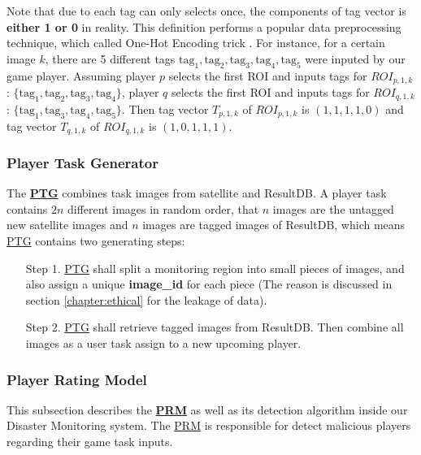 Note that due to each tag can only selects once, the components of tag vector is \textbf{either 1 or 0} in reality.
This definition performs a popular data preprocessing technique, which called One-Hot Encoding trick \cite{wu2012foundations, liu2002discretization}.
For instance, for a certain image $k$,
there are 5 different tags $\text{tag}_1, \text{tag}_2, \text{tag}_3, \text{tag}_4, \text{tag}_5$ were inputed
by our game player.
Assuming player $p$ selects the first ROI and inputs tags for $ROI_{p, 1, k}$: 
$\{\text{tag}_1, \text{tag}_2, \text{tag}_3, \text{tag}_4\}$, 
player $q$ selects the first ROI and inputs tags for $ROI_{q, 1, k}$:
$\{\text{tag}_1, \text{tag}_3, \text{tag}_4, \text{tag}_5\}$. 
Then tag vector $T_{p, 1, k}$ of $ROI_{p, 1, k}$ is $(1, 1, 1, 1, 0)$ and tag vector
$T_{q, 1, k}$ of $ROI_{q, 1, k}$ is $(1, 0, 1, 1, 1)$.

\subsubsection{Player Task Generator}

The \textbf{\hyperref[idx:ptg]{PTG}} combines task images from satellite and ResultDB.
A player task contains $2n$ different images in random order, that $n$ images are
the untagged new satellite images and $n$ images are tagged images of ResultDB, which means
\hyperref[idx:ptg]{PTG} contains two generating steps:

\begin{itemize}
\item [Step 1.] \hyperref[idx:ptg]{PTG} shall split a monitoring region into small pieces of images, 
and also assign a unique \textbf{image\_id} for each piece 
(The reason is discussed in section \ref{chapter:ethical} for the leakage of data).

\item [Step 2.] \hyperref[idx:ptg]{PTG} shall retrieve tagged images from ResultDB. Then combine
all images as a user task assign to a new upcoming player.
\end{itemize}

\subsubsection{Player Rating Model}
\label{chapter:prm}

This subsection describes the \textbf{\hyperref[idx:prm]{PRM}} as well as its detection algorithm 
inside our Disaster Monitoring system.
The \hyperref[idx:prm]{PRM} is responsible for detect malicious players regarding their game task inputs.

